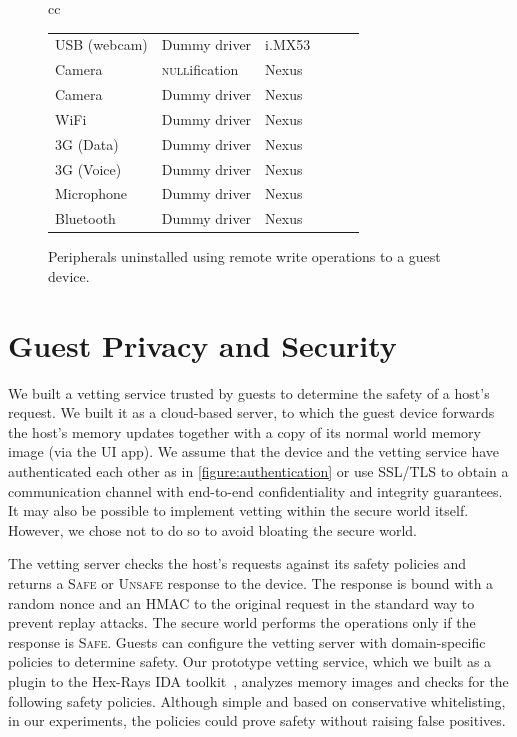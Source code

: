 \documentclass[pageno]{sig-alternate-05-2015}
\newcommand{\figref}[1]{\autoref{#1}}
\newcommand{\mysection}[1]{\section{#1}}
\newcommand{\mycaption}[2]{\caption{#1}#2}
\begin{document}
\begin{figure}[t!]
\begin{tabular}{cc}
\begin{minipage}{0.62\textwidth}
\begin{tabular}{|p{0.78in}|p{0.75in}|p{0.35in}|p{0.5in}|p{0.45in}|p{0.55in}|}
USB (webcam) & Dummy driver            & i.MX53 & \centcol{168} & \centcol{2.22} & \centcol{388}\\
Camera       & \textsc{null}ification  & Nexus  & \centcol{140} & \centcol{-}    & \centcol{332}\\
Camera       & Dummy driver            & Nexus  & \centcol{224} & \centcol{2.19} & \centcol{500}\\
WiFi         & Dummy driver            & Nexus  & \centcol{152} & \centcol{5.58} & \centcol{356}\\
3G (Data)    & Dummy driver            & Nexus  & \centcol{192} & \centcol{2.15} & \centcol{436}\\
3G (Voice)   & Dummy driver            & Nexus  & \centcol{124} & \centcol{2.15} & \centcol{300}\\
Microphone   & Dummy driver            & Nexus  & \centcol{164} & \centcol{2.27} & \centcol{380}\\
Bluetooth    & Dummy driver            & Nexus  & \centcol{32}  & \centcol{2.52} & \centcol{116}\\
\hline
\end{tabular}
\mycaption{Peripherals uninstalled using remote write operations to a guest
device.}{\label{table:uninstall}}
\end{minipage}
\end{tabular}
\end{figure}



\mysection{Guest Privacy and Security}
\label{section:vetting}

We built a vetting service trusted by guests to determine the safety of a
host's request. We built it as a cloud-based server, to which the guest device
forwards the host's memory updates together with a copy of its normal world
memory image (via the UI app). We assume that the device and the vetting
service have authenticated each other as in \figref{figure:authentication} or
use SSL/TLS to obtain a communication channel with end-to-end confidentiality
and integrity guarantees. It may also be possible to implement vetting within
the secure world itself. However, we chose not to do so to avoid bloating the
secure world.

The vetting server checks the host's requests against its safety policies and
returns a \textsc{Safe} or \textsc{Unsafe} response to the device. The response
is bound with a random nonce and an HMAC to the original request in the
standard way to prevent replay attacks. The secure world performs the
operations only if the response is \textsc{Safe}. Guests can configure the
vetting server with domain-specific policies to determine safety.  Our
prototype vetting service, which we built as a plugin to the Hex-Rays IDA
toolkit~\cite{ida-pro}, analyzes memory images and checks for the following
safety policies. Although simple and based on conservative whitelisting, in our
experiments, the policies could prove safety without raising false positives.
\end{document}
